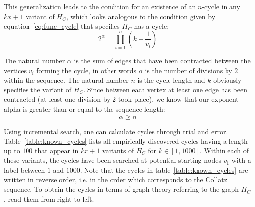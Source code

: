 This generalization leads to the condition for an existence of an $n$-cycle in any $kx+1$ variant of $H_C$, which looks analogous to the condition given by equation~\ref{eq:func_cycle} that specifies $H_C$ has a cycle:
\begin{equation}
\label{eq:generalized_cycle}
2^\alpha=\prod_{i=1}^{n}\left(k+\frac{1}{v_i}\right)
\end{equation}

The natural number $\alpha$ is the sum of edges that have been contracted between the vertices $v_i$ forming the cycle, in other words $\alpha$ is the number of divisions by $2$ within the sequence. The natural number $n$ is the cycle length and $k$ obviously specifies the variant of $H_C$. Since between each vertex at least one edge has been contracted (at least one division by $2$ took place), we know that our exponent alpha is greater than or equal to the sequence length:
\begin{equation}
\label{eq:n_alpha}
\alpha\ge n
\end{equation}

\par\medskip
Using incremental search, one can calculate cycles through trial and error. Table~\ref{table:known_cycles} lists all empirically discovered cycles having a length up to $100$ that appear in $kx+1$ variants of $H_C$ for $k\in[1,1000]$. Within each of these variants, the cycles have been searched at potential starting nodes $v_1$ with a label between $1$ and $1000$. Note that the cycles in table~\ref{table:known_cycles} are written in reverse order, i.e. in the order which corresponds to the Collatz sequence. To obtain the cycles in terms of graph theory referring to the graph $H_C$, read them from right to left.

